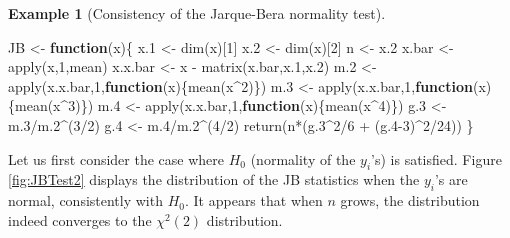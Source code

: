\documentclass[
  12pt,
]{book}
\newenvironment{Shaded}{\begin{snugshade}}{\end{snugshade}}
\newcommand{\ControlFlowTok}[1]{\textcolor[rgb]{0.13,0.29,0.53}{\textbf{#1}}}
\newcommand{\DecValTok}[1]{\textcolor[rgb]{0.00,0.00,0.81}{#1}}
\newcommand{\FloatTok}[1]{\textcolor[rgb]{0.00,0.00,0.81}{#1}}
\newcommand{\FunctionTok}[1]{\textcolor[rgb]{0.00,0.00,0.00}{#1}}
\newcommand{\NormalTok}[1]{#1}
\newcommand{\OtherTok}[1]{\textcolor[rgb]{0.56,0.35,0.01}{#1}}
\newcommand{\SpecialCharTok}[1]{\textcolor[rgb]{0.00,0.00,0.00}{#1}}
\theoremstyle{definition}
\theoremstyle{definition}
\newtheorem{example}{Example}[chapter]
\theoremstyle{definition}
\theoremstyle{definition}
\theoremstyle{remark}
\begin{document}
\begin{example}[Consistency of the Jarque-Bera normality test]
\begin{Shaded}
\begin{Highlighting}[]
\NormalTok{JB }\OtherTok{\textless{}{-}} \ControlFlowTok{function}\NormalTok{(x)\{}
\NormalTok{  x}\FloatTok{.1} \OtherTok{\textless{}{-}} \FunctionTok{dim}\NormalTok{(x)[}\DecValTok{1}\NormalTok{]}
\NormalTok{  x}\FloatTok{.2} \OtherTok{\textless{}{-}} \FunctionTok{dim}\NormalTok{(x)[}\DecValTok{2}\NormalTok{]}
\NormalTok{  n }\OtherTok{\textless{}{-}}\NormalTok{ x}\FloatTok{.2}
\NormalTok{  x.bar }\OtherTok{\textless{}{-}} \FunctionTok{apply}\NormalTok{(x,}\DecValTok{1}\NormalTok{,mean)}
\NormalTok{  x.x.bar }\OtherTok{\textless{}{-}}\NormalTok{ x }\SpecialCharTok{{-}} \FunctionTok{matrix}\NormalTok{(x.bar,x}\FloatTok{.1}\NormalTok{,x}\FloatTok{.2}\NormalTok{)}
\NormalTok{  m}\FloatTok{.2} \OtherTok{\textless{}{-}} \FunctionTok{apply}\NormalTok{(x.x.bar,}\DecValTok{1}\NormalTok{,}\ControlFlowTok{function}\NormalTok{(x)\{}\FunctionTok{mean}\NormalTok{(x}\SpecialCharTok{\^{}}\DecValTok{2}\NormalTok{)\})}
\NormalTok{  m}\FloatTok{.3} \OtherTok{\textless{}{-}} \FunctionTok{apply}\NormalTok{(x.x.bar,}\DecValTok{1}\NormalTok{,}\ControlFlowTok{function}\NormalTok{(x)\{}\FunctionTok{mean}\NormalTok{(x}\SpecialCharTok{\^{}}\DecValTok{3}\NormalTok{)\})}
\NormalTok{  m}\FloatTok{.4} \OtherTok{\textless{}{-}} \FunctionTok{apply}\NormalTok{(x.x.bar,}\DecValTok{1}\NormalTok{,}\ControlFlowTok{function}\NormalTok{(x)\{}\FunctionTok{mean}\NormalTok{(x}\SpecialCharTok{\^{}}\DecValTok{4}\NormalTok{)\})}
\NormalTok{  g}\FloatTok{.3} \OtherTok{\textless{}{-}}\NormalTok{ m}\FloatTok{.3}\SpecialCharTok{/}\NormalTok{m}\FloatTok{.2}\SpecialCharTok{\^{}}\NormalTok{(}\DecValTok{3}\SpecialCharTok{/}\DecValTok{2}\NormalTok{)}
\NormalTok{  g}\FloatTok{.4} \OtherTok{\textless{}{-}}\NormalTok{ m}\FloatTok{.4}\SpecialCharTok{/}\NormalTok{m}\FloatTok{.2}\SpecialCharTok{\^{}}\NormalTok{(}\DecValTok{4}\SpecialCharTok{/}\DecValTok{2}\NormalTok{)}
  \FunctionTok{return}\NormalTok{(n}\SpecialCharTok{*}\NormalTok{(g}\FloatTok{.3}\SpecialCharTok{\^{}}\DecValTok{2}\SpecialCharTok{/}\DecValTok{6} \SpecialCharTok{+}\NormalTok{ (g}\FloatTok{.4}\DecValTok{{-}3}\NormalTok{)}\SpecialCharTok{\^{}}\DecValTok{2}\SpecialCharTok{/}\DecValTok{24}\NormalTok{))}
\NormalTok{\}}
\end{Highlighting}
\end{Shaded}

Let us first consider the case where \(H_0\) (normality of the \(y_i\)'s) is satisfied. Figure \ref{fig:JBTest2} displays the distribution of the JB statistics when the \(y_i\)'s are normal, consistently with \(H_0\). It appears that when \(n\) grows, the distribution indeed converges to the \(\chi^2(2)\) distribution.


\end{example}
\end{document}
